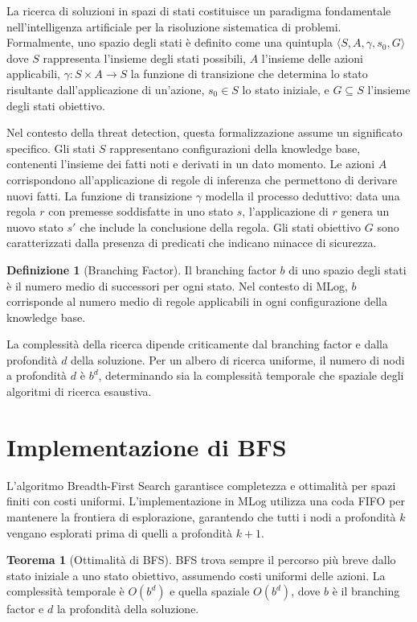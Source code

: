\documentclass[12pt,a4paper]{report}
\theoremstyle{definition}
\newtheorem{definizione}{Definizione}[chapter]
\newtheorem{teorema}{Teorema}[chapter]
\begin{document}
La ricerca di soluzioni in spazi di stati costituisce un paradigma fondamentale nell'intelligenza artificiale per la risoluzione sistematica di problemi. Formalmente, uno spazio degli stati è definito come una quintupla $\langle S, A, \gamma, s_0, G \rangle$ dove $S$ rappresenta l'insieme degli stati possibili, $A$ l'insieme delle azioni applicabili, $\gamma: S \times A \rightarrow S$ la funzione di transizione che determina lo stato risultante dall'applicazione di un'azione, $s_0 \in S$ lo stato iniziale, e $G \subseteq S$ l'insieme degli stati obiettivo.

Nel contesto della threat detection, questa formalizzazione assume un significato specifico. Gli stati $S$ rappresentano configurazioni della knowledge base, contenenti l'insieme dei fatti noti e derivati in un dato momento. Le azioni $A$ corrispondono all'applicazione di regole di inferenza che permettono di derivare nuovi fatti. La funzione di transizione $\gamma$ modella il processo deduttivo: data una regola $r$ con premesse soddisfatte in uno stato $s$, l'applicazione di $r$ genera un nuovo stato $s'$ che include la conclusione della regola. Gli stati obiettivo $G$ sono caratterizzati dalla presenza di predicati che indicano minacce di sicurezza.

\begin{definizione}[Branching Factor]
Il branching factor $b$ di uno spazio degli stati è il numero medio di successori per ogni stato. Nel contesto di MLog, $b$ corrisponde al numero medio di regole applicabili in ogni configurazione della knowledge base.
\end{definizione}

La complessità della ricerca dipende criticamente dal branching factor e dalla profondità $d$ della soluzione. Per un albero di ricerca uniforme, il numero di nodi a profondità $d$ è $b^d$, determinando sia la complessità temporale che spaziale degli algoritmi di ricerca esaustiva.

\section{Implementazione di BFS}

L'algoritmo Breadth-First Search garantisce completezza e ottimalità per spazi finiti con costi uniformi. L'implementazione in MLog utilizza una coda FIFO per mantenere la frontiera di esplorazione, garantendo che tutti i nodi a profondità $k$ vengano esplorati prima di quelli a profondità $k+1$.

\begin{teorema}[Ottimalità di BFS]
BFS trova sempre il percorso più breve dallo stato iniziale a uno stato obiettivo, assumendo costi uniformi delle azioni. La complessità temporale è $O(b^d)$ e quella spaziale $O(b^d)$, dove $b$ è il branching factor e $d$ la profondità della soluzione.
\end{teorema}
\end{document}
